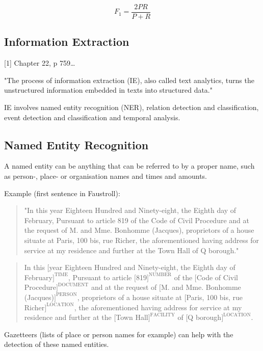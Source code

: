 \begin{equation}
F_1 = \frac{2PR}{P+R}
\end{equation}

\subsection{Information Extraction}

[1] Chapter 22, p 759…

"The process of information extraction (IE), also called text analytics, turns the unstructured information embedded in texts into structured data."

IE involves named entity recognition (NER), relation detection and classification, event detection and classification and temporal analysis.

\subsection{Named Entity Recognition}

A named entity can be anything that can be referred to by a proper name, such as person-, place- or organisation names and times and amounts.

Example (first sentence in Faustroll):

\begin{quote}
"In this year Eighteen Hundred and Ninety-eight, the Eighth day of February, Pursuant to article 819 of the Code of Civil Procedure and at the request of M. and Mme. Bonhomme (Jacques), proprietors of a house situate at Paris, 100 bis, rue Richer, the aforementioned having address for service at my residence and further at the Town Hall of Q borough."
\end{quote}

\begin{quote}
In this $[$year Eighteen Hundred and Ninety-eight, the Eighth day of February$]^{\text{TIME}}$, Pursuant to article $[$819$]^{\text{NUMBER}}$ of the $[$Code of Civil Procedure$]^{\text{DOCUMENT}}$ and at the request of $[$M. and Mme. Bonhomme (Jacques)$]^{\text{PERSON}}$, proprietors of a house situate at $[$Paris, 100 bis, rue Richer$]^{\text{LOCATION}}$, the aforementioned having address for service at my residence and further at the $[$Town Hall$]^{\text{FACILITY}}$ of $[$Q borough$]^{\text{LOCATION}}$.
\end{quote}

Gazetteers (lists of place or person names for example) can help with the detection of these named entities.

